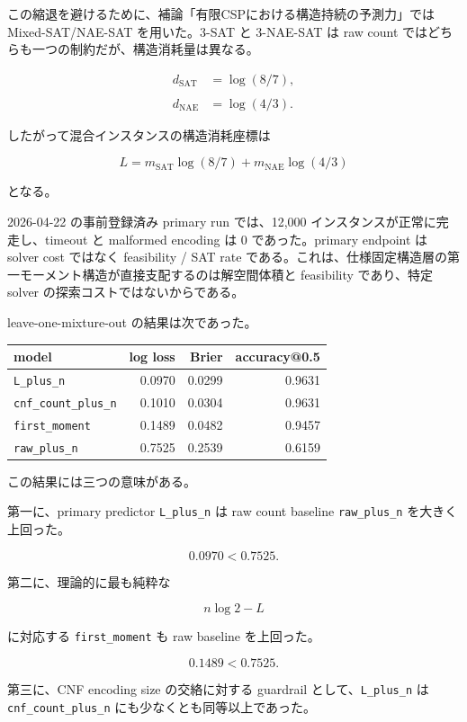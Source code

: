 \documentclass[12pt,a4paper]{article}
\begin{document}
この縮退を避けるために、補論「有限CSPにおける構造持続の予測力」では Mixed-SAT/NAE-SAT を用いた。3-SAT と 3-NAE-SAT は raw count ではどちらも一つの制約だが、構造消耗量は異なる。

\[
\begin{aligned}
d_{\mathrm{SAT}}&=\log(8/7), \\
\qquad \\
d_{\mathrm{NAE}}&=\log(4/3).
\end{aligned}
\]

したがって混合インスタンスの構造消耗座標は

\[
L = m_{\mathrm{SAT}}\log(8/7) + m_{\mathrm{NAE}}\log(4/3)
\]

となる。

2026-04-22 の事前登録済み primary run では、12,000 インスタンスが正常に完走し、timeout と malformed encoding は 0 であった。primary endpoint は solver cost ではなく feasibility / SAT rate である。これは、仕様固定構造層の第一モーメント構造が直接支配するのは解空間体積と feasibility であり、特定 solver の探索コストではないからである。

leave-one-mixture-out の結果は次であった。

{\def\LTcaptype{table} %
\begin{longtable}[]{@{}lrrr@{}}
\toprule\noalign{}
model & log loss & Brier & accuracy@0.5 \\
\midrule\noalign{}
\endhead
\bottomrule\noalign{}
\endlastfoot
\texttt{L\_plus\_n} & 0.0970 & 0.0299 & 0.9631 \\
\texttt{cnf\_count\_plus\_n} & 0.1010 & 0.0304 & 0.9631 \\
\texttt{first\_moment} & 0.1489 & 0.0482 & 0.9457 \\
\texttt{raw\_plus\_n} & 0.7525 & 0.2539 & 0.6159 \\
\end{longtable}
}

この結果には三つの意味がある。

第一に、primary predictor \texttt{L\_plus\_n} は raw count baseline \texttt{raw\_plus\_n} を大きく上回った。

\[
0.0970 < 0.7525.
\]

第二に、理論的に最も純粋な

\[
n\log 2-L
\]

に対応する \texttt{first\_moment} も raw baseline を上回った。

\[
0.1489 < 0.7525.
\]

第三に、CNF encoding size の交絡に対する guardrail として、\texttt{L\_plus\_n} は \texttt{cnf\_count\_plus\_n} にも少なくとも同等以上であった。
\end{document}
